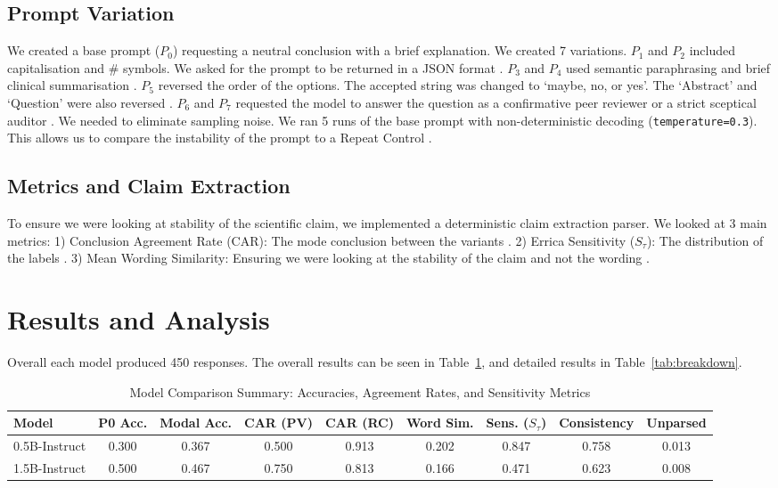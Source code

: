\documentclass[10pt, conference, letterpaper]{IEEEtran}
\begin{document}
\subsection{Prompt Variation}
We created a base prompt ($P_{0}$) requesting a neutral conclusion with a brief explanation. We created 7 variations. $P_{1}$ and $P_{2}$ included capitalisation and \# symbols. We asked for the prompt to be returned in a JSON format \cite{sclar2024quantifying}. $P_{3}$ and $P_{4}$ used semantic paraphrasing and brief clinical summarisation \cite{errica2025wrong}. $P_{5}$ reversed the order of the options. The accepted string was changed to `maybe, no, or yes'. The `Abstract' and `Question' were also reversed \cite{lu2022fantastically}. $P_{6}$ and $P_{7}$ requested the model to answer the question as a confirmative peer reviewer or a strict sceptical auditor \cite{webson2022do}. We needed to eliminate sampling noise. We ran 5 runs of the base prompt with non-deterministic decoding (\texttt{temperature=0.3}). This allows us to compare the instability of the prompt to a Repeat Control \cite{wang2023self}.

\subsection{Metrics and Claim Extraction}
To ensure we were looking at stability of the scientific claim, we implemented a deterministic claim extraction parser. We looked at 3 main metrics: 1) Conclusion Agreement Rate (CAR): The mode conclusion between the variants \cite{mizrahi2024state}. 2) Errica Sensitivity ($S_{\tau}$): The distribution of the labels \cite{errica2025wrong}. 3) Mean Wording Similarity: Ensuring we were looking at the stability of the claim and not the wording \cite{kamalloo2023evaluating}.

\section{Results and Analysis}
Overall each model produced 450 responses. The overall results can be seen in Table~\ref{tab:summary}, and detailed results in Table~\ref{tab:breakdown}.

\begin{table}[htbp]
\centering
\caption{Model Comparison Summary: Accuracies, Agreement Rates, and Sensitivity Metrics}
\label{tab:summary}
\begin{tabular}{@{}lcccccccc@{}}
\toprule
\textbf{Model} & \textbf{P0 Acc.} & \textbf{Modal Acc.} & \textbf{CAR (PV)} & \textbf{CAR (RC)} & \textbf{Word Sim.} & \textbf{Sens. ($S_\tau$)} & \textbf{Consistency} & \textbf{Unparsed} \\ \midrule
0.5B-Instruct & 0.300 & 0.367 & 0.500 & 0.913 & 0.202 & 0.847 & 0.758 & 0.013 \\
1.5B-Instruct & 0.500 & 0.467 & 0.750 & 0.813 & 0.166 & 0.471 & 0.623 & 0.008 \\ \bottomrule
\end{tabular}
\end{table}
\end{document}
